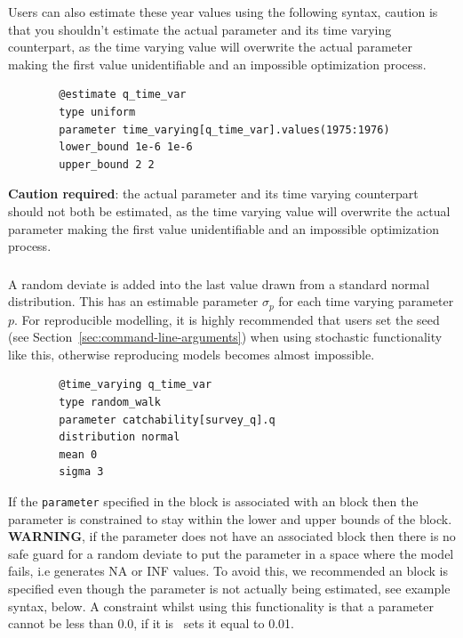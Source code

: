 Users can also estimate these year values using the following syntax, caution is that you shouldn't estimate the actual parameter and its time varying counterpart, as the time varying value will overwrite the actual parameter making the first value unidentifiable and an impossible optimization process.
{\small{\begin{verbatim}
		@estimate q_time_var
		type uniform
		parameter time_varying[q_time_var].values(1975:1976)
		lower_bound 1e-6 1e-6
		upper_bound 2 2
		\end{verbatim}}}

\textbf{Caution required}: the actual parameter and its time varying counterpart should not both be estimated, as the time varying value will overwrite the actual parameter making the first value unidentifiable and an impossible optimization process.

\subsubsection[Random Walk]{}

A random deviate is added into the last value drawn from a standard normal distribution. This has an estimable parameter $\sigma_p$ for each time varying parameter $p$. For reproducible modelling, it is highly recommended that users set the seed (see Section~\ref{sec:command-line-arguments}) when using stochastic functionality like this, otherwise reproducing models becomes almost impossible.
{\small{\begin{verbatim}
		@time_varying q_time_var
		type random_walk
		parameter catchability[survey_q].q
		distribution normal
		mean 0
		sigma 3
		\end{verbatim}}}

If the \texttt{parameter} specified in the  block is associated with an  block then the parameter is constrained to stay within the lower and upper bounds of the  block. \textbf{WARNING}, if the parameter does not have an associated  block then there is no safe guard for a random deviate to put the parameter in a space where the model fails, i.e generates NA or INF values. To avoid this, we recommended an  block is specified even though the parameter is not actually being estimated, see example syntax, below. A constraint whilst using this functionality is that a parameter cannot be less than 0.0, if it is \CNAME\ sets it equal to 0.01.

